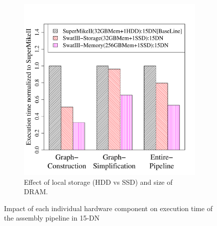 \documentclass[10pt, conference, compsocconf]{IEEEtran}
\begin{document}
\begin{figure}[htb]
\begin{subfigure}[b]{0.23\textwidth}
                \includegraphics[width=\textwidth]{Figure/PerormanceData/Plots/StorageMemory.pdf}
                \caption{Effect of local storage (HDD vs SSD) and size of DRAM.}
                \label{fig:SuperMikeSwatStorageMemory}
   \end{subfigure}
   \caption{Impact of each individual hardware component on execution time of the assembly pipeline in 15-DN }
  \label{fig:SuperMikeSwat}
  \vspace{-1.1em}
\end{figure}
\end{document}
